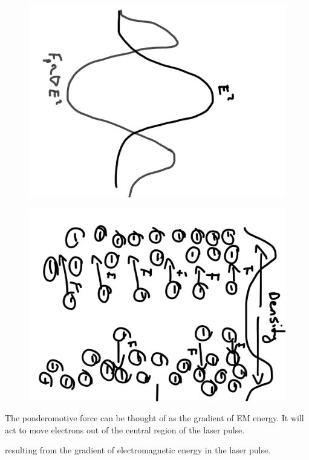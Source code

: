 \documentclass[12pt, titlepage]{article}
\begin{document}
 \begin{marginfigure}
    \centering
    \begin{subfigure}[b]{.75\marginparwidth}
    \includegraphics[angle=90,width=\linewidth]{../figures/pondforce.png}
\end{subfigure}

\begin{subfigure}[b]{.75\marginparwidth}
    \includegraphics[width=\linewidth, angle=90]{../figures/ionback.png}
\end{subfigure}
\caption{The ponderomotive force can be thought of as the gradient of EM energy.
It will act to move electrons out of the central region of the laser pulse.}
\end{marginfigure}
   resulting from the gradient of electromagnetic energy in the laser pulse.
\end{document}
